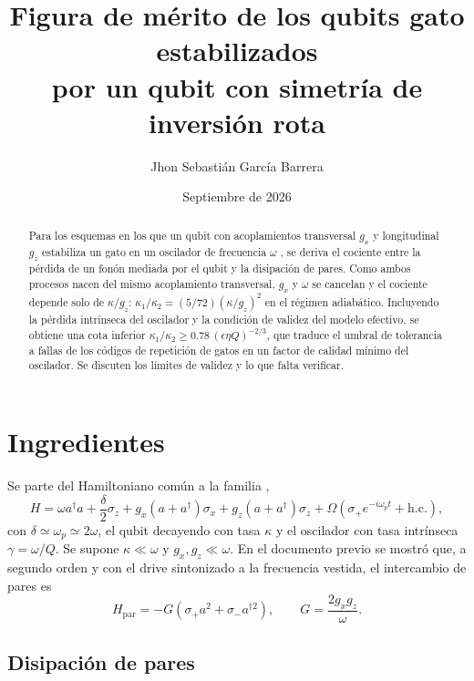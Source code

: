 \documentclass[11pt]{report}
\title{Figura de m\'erito de los qubits gato estabilizados\\ por un qubit con simetr\'ia de inversi\'on rota}
\author{Jhon Sebasti\'an Garc\'ia Barrera}
\date{Septiembre de 2026}
\newcommand{\spl}{\sigma_{+}}
\newcommand{\smi}{\sigma_{-}}
\begin{document}
\maketitle

\begin{abstract}
Para los esquemas en los que un qubit con acoplamientos transversal $g_{x}$ y longitudinal $g_{z}$ estabiliza un gato en un oscilador de frecuencia $\omega$ \cite{Ma2019,Naseem2026}, se deriva el cociente entre la p\'erdida de un fon\'on mediada por el qubit y la disipaci\'on de pares. Como ambos procesos nacen del mismo acoplamiento transversal, $g_{x}$ y $\omega$ se cancelan y el cociente depende solo de $\kappa/g_{z}$: $\kappa_{1}/\kappa_{2}=(5/72)(\kappa/g_{z})^{2}$ en el r\'egimen adiab\'atico. Incluyendo la p\'erdida intr\'inseca del oscilador y la condici\'on de validez del modelo efectivo, se obtiene una cota inferior $\kappa_{1}/\kappa_{2}\geq0.78\,(\epsilon\eta Q)^{-2/3}$, que traduce el umbral de tolerancia a fallas de los c\'odigos de repetici\'on de gatos \cite{GuillaudMirrahimi2021} en un factor de calidad m\'inimo del oscilador. Se discuten los l\'imites de validez y lo que falta verificar.
\end{abstract}

\section{Ingredientes}

Se parte del Hamiltoniano com\'un a la familia \cite{Ma2019,Naseem2026},
\begin{equation}
H=\omega a^{\dagger}a+\frac{\delta}{2}\sigma_{z}+g_{x}(a+a^{\dagger})\sigma_{x}+g_{z}(a+a^{\dagger})\sigma_{z}+\Omega(\spl e^{-i\omega_{p}t}+\mathrm{h.c.}),
\end{equation}
con $\delta\simeq\omega_{p}\simeq2\omega$, el qubit decayendo con tasa $\kappa$ y el oscilador con tasa intr\'inseca $\gamma=\omega/Q$. Se supone $\kappa\ll\omega$ y $g_{x},g_{z}\ll\omega$. En el documento previo se mostr\'o que, a segundo orden y con el drive sintonizado a la frecuencia vestida, el intercambio de pares es
\begin{equation}
H_{\mathrm{par}}=-G\left(\spl a^{2}+\smi a^{\dagger 2}\right),\qquad G=\frac{2g_{x}g_{z}}{\omega}.
\end{equation}

\subsection{Disipaci\'on de pares}
\end{document}
